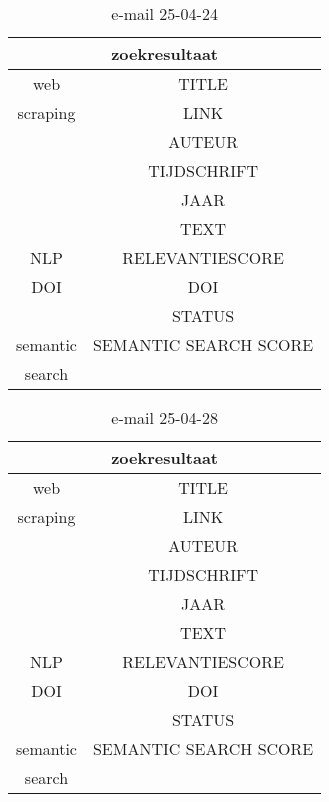 \begin{table}[h!]
    \caption{e-mail 25-04-24}
    \centering
    \begin{tabular}{|c|c|} 
        \hline
        \multicolumn{2}{|c|}{\textbf{zoekresultaat}} \\
        \hline
        web &TITLE\\
        scraping&LINK\\
        &AUTEUR\\
        &TIJDSCHRIFT\\
        &JAAR\\
        &TEXT\\
        \hline
        NLP&RELEVANTIESCORE\\
        \hline
        DOI&DOI\\
        &STATUS\\
        \hline
        semantic&SEMANTIC SEARCH SCORE\\
        search&\\
        \hline
    \end{tabular}
    \label{table:email20250424}
\end{table}
\begin{table}[h!]
    \caption{e-mail 25-04-28}
    \centering
    \begin{tabular}{|c|c|} 
        \hline
        \multicolumn{2}{|c|}{\textbf{zoekresultaat}} \\
        \hline
        web &TITLE\\
        scraping&LINK\\
        &AUTEUR\\
        &TIJDSCHRIFT\\
        &JAAR\\
        &TEXT\\
        \hline
        NLP&RELEVANTIESCORE\\
        \hline
        DOI&DOI\\
        &STATUS\\
        \hline
        semantic&SEMANTIC SEARCH SCORE\\
        search&\\
        \hline
    \end{tabular}
    \label{table:email20250428}
\end{table}
